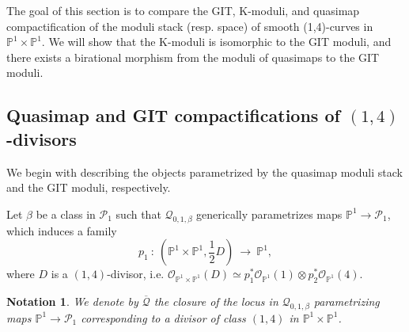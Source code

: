 \documentclass[a4paper,12pt]{amsart}
\newcommand{\mtc}[1]{\mathcal{#1}}
\newcommand{\cQ}{\mathcal{Q}}
\newcommand{\bP}{{\mathbb P}}
\newcommand{\sP}{{\mathscr{P}}}
\newtheorem*{notation}{Notation}
\theoremstyle{definition}
\theoremstyle{remark}
\begin{document}
The goal of this section is to compare the GIT, K-moduli, and quasimap compactification of the moduli stack (resp. space) of smooth (1,4)-curves in $\bP^1\times \bP^1$. We will show that the K-moduli is isomorphic to the GIT moduli, and there exists a birational morphism from the moduli of quasimaps to the GIT moduli.

\subsection{Quasimap and GIT compactifications of $(1,4)$-divisors}\label{sec:GIT and quasimap classification} We begin with describing the objects parametrized by the quasimap moduli stack and the GIT moduli, respectively. 

Let $\beta$ be a class in $\sP_1$ such that $\cQ_{0,1,\beta}$ generically parametrizes maps $\bP^1\to \sP_1$, which induces a family $$\textstyle p_1\ :\  (\bP^1\times\bP^1,\frac{1}{2}D) \ \longrightarrow\  \bP^1,$$ where $D$ is a $(1,4)$-divisor, i.e. $\mtc{O}_{\bP^1\times\bP^1}(D)\simeq p_1^*\mtc{O}_{\bP^1}(1)\otimes p_2^*\mtc{O}_{\bP^1}(4)$. 
\begin{notation}
    \textup{We denote by $\overline{\cQ}$ the closure of the locus in $\cQ_{0,1,\beta}$ parametrizing maps $\bP^1\to \sP_1$ corresponding to a divisor of class $(1,4)$ in $\bP^1\times \bP^1$.}
\end{notation}
\end{document}
